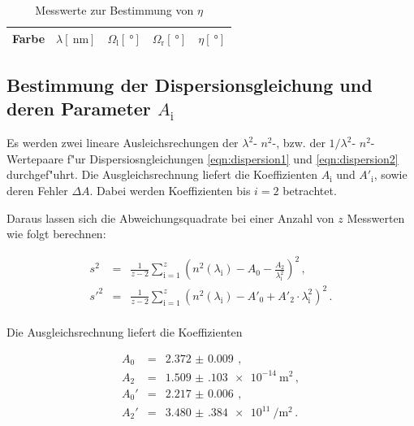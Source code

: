 		\begin{table}[h!]
			\begin{center}
				\caption{Messwerte zur Bestimmung von $\eta$ \label{table:eta}}
				\begin{tabular}{|c|c|c|c|c|}
					\hline
						Farbe & $\lambda [\SI{}{\nano \meter}]$ & $\Omega_\mathrm{l} [\SI{}{\degree}]$ & $\Omega_\mathrm{r} [\SI{}{\degree}]$ & $\eta [\SI{}{\degree}]$ \\
					\hline 
					\hline
						
					\hline 
				\end{tabular}
			\end{center}
		\end{table}		



	\subsection{Bestimmung der Dispersionsgleichung und deren Parameter $A_\mathrm{i}$}
	\label{subsec:dispersionskurve}
		Es werden zwei lineare Ausleichsrechungen der $\lambda^2$- $n^2$-, bzw. der $1 / \lambda^2$- $n^2$- Wertepaare f"ur Dispersiosngleichungen \eqref{eqn:dispersion1} und \eqref{eqn:dispersion2} durchgef"uhrt.
		Die Ausgleichsrechnung liefert die Koeffizienten $A_\mathrm{i}$ und $A'_\mathrm{i}$, sowie deren Fehler $\Delta A$.
		Dabei werden Koeffizienten bis $i = 2$ betrachtet.

		Daraus lassen sich die Abweichungsquadrate bei einer Anzahl von $z$ Messwerten wie folgt berechnen:

		\begin{eqnarray*}
			s^2 & = & \frac{1}{z - 2} \sum_{\mathrm{i} = 1}^z{\left(n^2(\lambda_\mathrm{i}) - A_0 - \frac{A_2}{\lambda_\mathrm{i}^2}\right)^2} \,, \\
			s'^2 & = & \frac{1}{z - 2} \sum_{\mathrm{i} = 1}^z{\left(n^2(\lambda_\mathrm{i}) - A'_0 + A'_2 \cdot \lambda_\mathrm{i}^2 \right)^2} \,. \\
		\end{eqnarray*}

		Die Ausgleichsrechnung liefert die Koeffizienten

		\begin{eqnarray*}
			A_0 & = & \SI{2.372(9)}{} \,, \\
			A_2 & = & \SI{1.509(103)e-14}{\meter \squared} \,, \\
			A_0' & = & \SI{2.217(6)}{} \,, \\
			A_2' & = & \SI{3.480(384)e11}{\per \meter \tothe{2}}\,. \\
		\end{eqnarray*}


